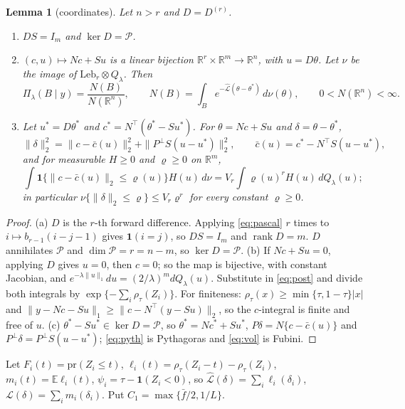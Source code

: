 \documentclass[11pt]{article}
\newtheorem{lemma}{Lemma}
\theoremstyle{definition}
\theoremstyle{remark}
\newcommand{\R}{\mathbb{R}}
\newcommand{\E}{\mathbb{E}}
\newcommand{\pr}{\mathrm{pr}}
\newcommand{\Dr}{D^{(r)}}
\newcommand{\thetas}{\theta^{*}}
\newcommand{\Lh}{\widehat{\mathcal L}}
\newcommand{\Lm}{\mathcal L}
\newcommand{\Ql}{Q_\lambda}
\newcommand{\Pp}{P^{\perp}}
\newcommand{\cP}{\mathcal P}
\newcommand{\fu}{\bar f}
\newcommand{\ind}{\mathbf 1}
\begin{document}
\begin{lemma}[coordinates]\label{lem:coord}
Let $n>r$ and $D=\Dr$.
\begin{enumerate}[label=(\alph*),itemsep=1pt,topsep=2pt]
\item $DS=I_m$ and $\ker D=\cP$.
\item $(c,u)\mapsto Nc+Su$ is a linear bijection $\R^r\times\R^m\to\R^n$, with $u=D\theta$. Let $\nu$ be the image of $\mathrm{Leb}_r\otimes\Ql$. Then
\begin{equation}\label{eq:ratio}
\Pi_\lambda(B\mid y)=\frac{N(B)}{N(\R^n)},\qquad N(B)=\int_Be^{-\Lh(\theta-\thetas)}\,d\nu(\theta),\qquad 0<N(\R^n)<\infty .
\end{equation}
\item Let $u^{*}=D\thetas$ and $c^{*}=N^\top(\thetas-Su^{*})$. For $\theta=Nc+Su$ and $\delta=\theta-\thetas$,
\begin{equation}\label{eq:pyth}
\|\delta\|_2^2=\|c-\bar c(u)\|_2^2+\|\Pp S(u-u^{*})\|_2^2,\qquad \bar c(u)=c^{*}-N^\top S(u-u^{*}),
\end{equation}
and for measurable $H\ge0$ and $\varrho\ge0$ on $\R^m$,
\begin{equation}\label{eq:vol}
\int\ind\{\|c-\bar c(u)\|_2\le\varrho(u)\}H(u)\,d\nu=V_r\int\varrho(u)^rH(u)\,d\Ql(u);
\end{equation}
in particular $\nu\{\|\delta\|_2\le\varrho\}\le V_r\varrho^r$ for every constant $\varrho\ge0$.
\end{enumerate}
\end{lemma}

\begin{proof}
(a) $D$ is the $r$-th forward difference. Applying \eqref{eq:pascal} $r$ times to $i\mapsto b_{r-1}(i-j-1)$ gives $\ind(i=j)$, so $DS=I_m$ and $\operatorname{rank}D=m$. $D$ annihilates $\cP$ and $\dim\cP=r=n-m$, so $\ker D=\cP$.
(b) If $Nc+Su=0$, applying $D$ gives $u=0$, then $c=0$; so the map is bijective, with constant Jacobian, and $e^{-\lambda\|u\|_1}du=(2/\lambda)^md\Ql(u)$. Substitute in \eqref{eq:post} and divide both integrals by $\exp\{-\sum_i\rho_\tau(Z_i)\}$. For finiteness: $\rho_\tau(x)\ge\min\{\tau,1-\tau\}|x|$ and $\|y-Nc-Su\|_1\ge\|c-N^\top(y-Su)\|_2$, so the $c$-integral is finite and free of $u$.
(c) $\thetas-Su^{*}\in\ker D=\cP$, so $\thetas=Nc^{*}+Su^{*}$, $P\delta=N\{c-\bar c(u)\}$ and $\Pp\delta=\Pp S(u-u^{*})$; \eqref{eq:pyth} is Pythagoras and \eqref{eq:vol} is Fubini.
\end{proof}

Let $F_i(t)=\pr(Z_i\le t)$, $\ell_i(t)=\rho_\tau(Z_i-t)-\rho_\tau(Z_i)$, $m_i(t)=\E\ell_i(t)$, $\psi_i=\tau-\ind(Z_i<0)$, so $\Lh(\delta)=\sum_i\ell_i(\delta_i)$, $\Lm(\delta)=\sum_im_i(\delta_i)$. Put $C_1=\max\{\fu/2,1/L\}$.
\end{document}
